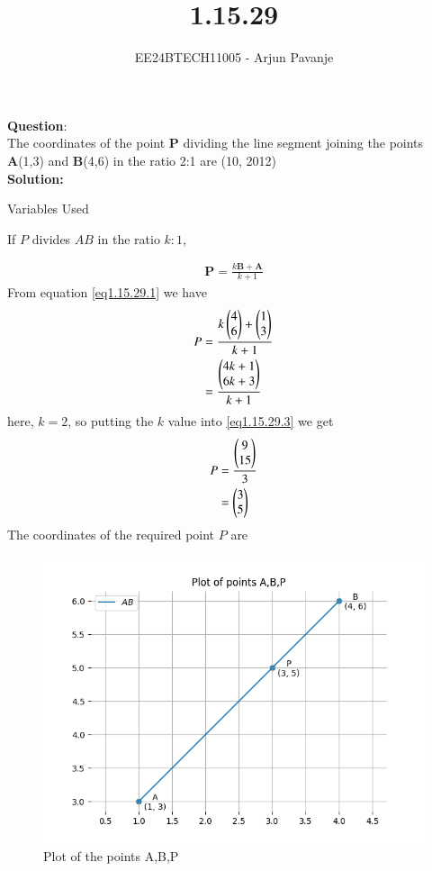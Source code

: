 \documentclass[journal]{IEEEtran}
\begin{document}

\vspace{3cm}

\title{1.15.29}
\author{EE24BTECH11005 - Arjun Pavanje
}
{\let\newpage\relax\maketitle}

\textbf{Question}:\\
The coordinates of the point \textbf{P} dividing the line segment joining the points \textbf{A}(1,3) and \textbf{B}(4,6) in the ratio 2:1 are
\hfill (10, 2012)
\\
\textbf{Solution: }
\begin{table}[h!]    
  \centering
  
  \caption{Variables Used}
  \label{tab1.15.29}
\end{table}
If $P$ divides $AB$ in the ratio $k:1$,


\begin{align} 
\textbf{P}=\frac{k\textbf{B}+\textbf{A}}{k+1} \label{eq1.15.29.1}
\end{align}
From equation \ref{eq1.15.29.1} we have
\begin{align}
P &= \frac{k
\begin{pmatrix}
4\\
6\end{pmatrix} +
\begin{pmatrix}
1\\
3\end{pmatrix}}{k+1} \label{eq1.15.29.2}\\
&= \frac{
\begin{pmatrix}
4k+1 \\
6k+3
\end{pmatrix}}{k+1} \label{eq1.15.29.3}
\end{align}
here, $k = 2$, so putting the $k$ value into \ref{eq1.15.29.3} we get
\begin{align}
P &= \frac{
\begin{pmatrix}
9\\
15
\end{pmatrix}}{3} \label{eq1.15.29.4}\\
&=
\begin{pmatrix}
3\\
5
	\end{pmatrix} \label{eq1.15.29.5}
\end{align}
The coordinates of the required point $P$ are
\begin{figure}[h!]
   \centering
   \includegraphics[width=0.7\linewidth]{figs/Figure_1.png}
   \caption{Plot of the points A,B,P}
   \label{stemplot}
\end{figure}
\end{document}
